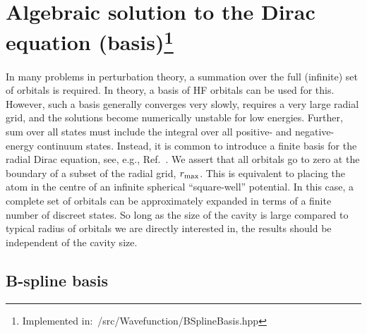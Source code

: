 \documentclass[10pt,twocolumn,a4paper]{article}%
\begin{document}
\section[Algebraic solution to the Dirac equation (basis)]{Algebraic solution to the Dirac equation (basis)\label{sec:finite-basis}\footnote{Implemented in:~/src/Wavefunction/BSplineBasis.hpp}}

In many problems in perturbation theory, a summation over the full (infinite) set of orbitals is required.
In theory, a basis of HF orbitals can be used for this.
However, such a basis generally converges very slowly, requires a very large radial grid, and the solutions become numerically unstable for low energies.
Further, sum over all states must include the integral over all positive- and negative-energy continuum states.
%
Instead, it is common to introduce a finite basis for the radial Dirac equation, see, e.g., Ref.~\cite{Quiney1987,Johnson1988}.
%
We assert that all orbitals go to zero at the boundary of a subset of the radial grid, $r_{\rm max}$.
This is equivalent to placing the atom in the centre of an infinite spherical ``square-well'' potential.
In this case, a complete set of orbitals can be approximately expanded in terms of a finite number of discreet states.
So long as the size of the cavity is large compared to typical radius of orbitals we are directly interested in, the results should be independent of the cavity size.




\subsection{B-spline basis}\label{sec:Bsplines}
\end{document}
